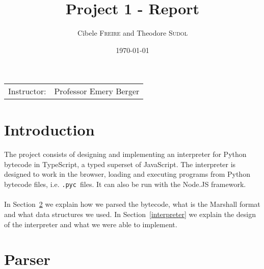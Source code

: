 \documentclass{article}
\title{Project 1 - Report} %
\author{Cibele \textsc{Freire} and Theodore \textsc{Sudol}} %
\date{\today} %
\newcommand{\pyc}{\texttt{.pyc~}}
\begin{document}

\maketitle %

\begin{center}
\begin{tabular}{l r}
Instructor: & Professor Emery Berger %
\end{tabular}
\end{center}





\section{Introduction}\label{intro}

\paragraph{}
The project consists of designing and implementing an interpreter for Python bytecode in TypeScript, a typed superset of JavaScript. The interpreter is designed to work in the browser, loading and executing programs from Python bytecode files, i.e. \pyc files. It can also be run with the Node.JS framework.

\paragraph{}
In Section~\ref{parser} we explain how we parsed the bytecode, what is the Marshall format and what data structures we used. In Section~\ref{interpreter} we explain the design of the interpreter and what we were able to implement.

\section{Parser}\label{parser}
\end{document}

